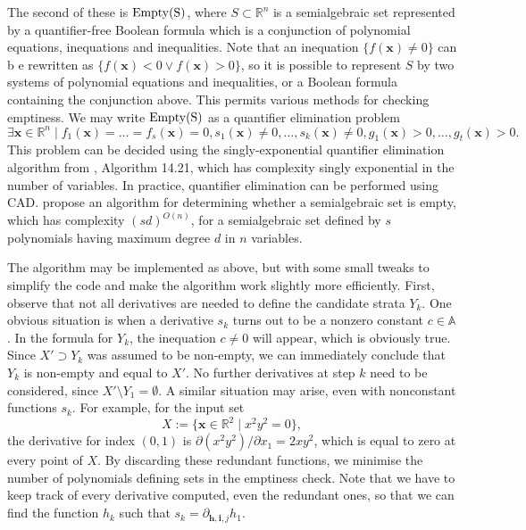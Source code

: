 \documentclass[
]{book}
\theoremstyle{definition}
\theoremstyle{definition}
\theoremstyle{definition}
\theoremstyle{definition}
\theoremstyle{remark}
\begin{document}
The second of these is \(\rm{Empty}(S)\), where \(S \subset \mathbb{R}^n\) is a semialgebraic set represented by a quantifier-free Boolean formula which is a conjunction of polynomial equations, inequations and inequalities. Note that an inequation \(\{ f(\mathbf{x}) \ne 0 \}\) can b e rewritten as \(\{ f(\mathbf{x}) < 0 \lor f(\mathbf{x}) > 0 \}\), so it is possible to represent \(S\) by two systems of polynomial equations and inequalities, or a Boolean formula containing the conjunction above. This permits various methods for checking emptiness. We may write \(\rm{Empty}(S)\) as a quantifier elimination problem
\[
\exists \mathbf{x} \in \mathbb{R}^n \mid f_1(\mathbf{x}) = \ldots = f_s(\mathbf{x}) = 0, s_1(\mathbf{x}) \ne 0, \ldots, s_k(\mathbf{x}) \ne 0, g_1(\mathbf{x}) > 0, \ldots, g_t(\mathbf{x}) > 0.
\]
This problem can be decided using the singly-exponential quantifier elimination algorithm from \citet{bpr2006}, Algorithm 14.21, which has complexity singly exponential in the number of variables. In practice, quantifier elimination can be performed using CAD. \citet{bpr98} propose an algorithm for determining whether a semialgebraic set is empty, which has complexity \((sd)^{O(n)}\), for a semialgebraic set defined by \(s\) polynomials having maximum degree \(d\) in \(n\) variables.

The algorithm may be implemented as above, but with some small tweaks to simplify the code and make the algorithm work slightly more efficiently.
First, observe that not all derivatives are needed to define the candidate strata \(Y_k\). One obvious situation is when a derivative \(s_k\) turns out to be a nonzero constant \(c \in \mathbb{A}\).
In the formula for \(Y_k\), the inequation \(c \ne 0\) will appear, which is obviously true. Since \(X' \supset Y_k\) was assumed to be non-empty, we can immediately conclude that \(Y_k\) is non-empty and equal to \(X'\). No further derivatives at step \(k\) need to be considered, since \(X' \setminus Y_1 = \emptyset\).
A similar situation may arise, even with nonconstant functions \(s_k\). For example, for the input set
\[
X := \{ \mathbf{x} \in \mathbb{R}^2 \mid x^2 y^2 = 0 \},
\]
the derivative for index \((0,1)\) is \(\partial (x^2 y^2) / \partial x_1 = 2x y^2\), which is equal to zero at every point of \(X\).
By discarding these redundant functions, we minimise the number of polynomials defining sets in the emptiness check. Note that we have to keep track of every derivative computed, even the redundant ones, so that we can find the function \(h_k\) such that \(s_k = \partial_{\mathbf{h}, \mathbf{i}, j} h_1\).
\end{document}
